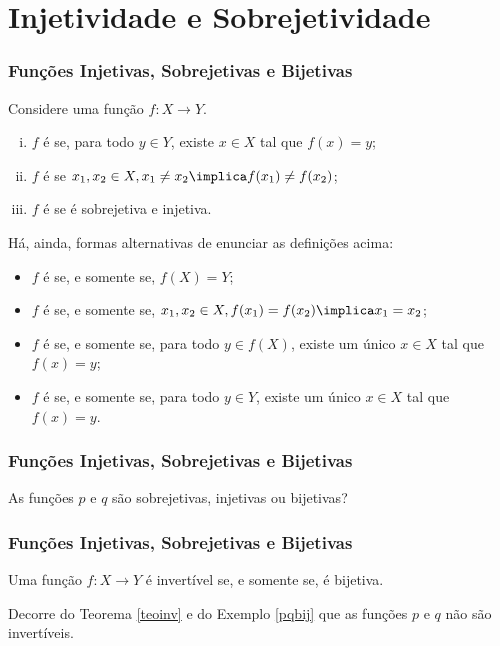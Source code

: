\section{Injetividade e Sobrejetividade}
\begin{frame}
\frametitle{Funções Injetivas, Sobrejetivas e Bijetivas} 


\begin{definicao}
Considere uma função $f: X \to Y$.
\begin{enumerate}[(i)]
	\item $f$ é  se, para todo $y \in Y$, existe $x
	\in X$ tal que $f(x) = y$;
	\item $f$ é  se $x_1, x_2 \in X, x_1 \neq x_2
	\implica f(x_1) \neq f(x_2)$;
	\item $f$ é  se é sobrejetiva e injetiva.
\end{enumerate}
\end{definicao}\pause
Há, ainda, formas alternativas de enunciar as definições acima:
\begin{itemize}
	\item $f$ é  se, e somente se, $f(X) = Y$;
	\item $f$ é  se, e somente se, $x_1, x_2 \in X, f(x_1) = f(x_2)
	\implica x_1 = x_2 $;
	\item $f$ é  se, e somente se, para todo $y \in
	f(X)$, existe um único $x \in X$ tal que $f(x) = y$;
	\item $f$ é  se, e somente se, para todo $y \in Y$,
	existe um único $x \in X$ tal que $f(x) = y$.
\end{itemize}
\end{frame}




\begin{frame}
\frametitle{Funções Injetivas, Sobrejetivas e Bijetivas} 

\begin{exemplo}\label{pqbij}
As funções $p$ e $q$ são sobrejetivas, injetivas ou bijetivas?
\end{exemplo}
\end{frame}




\begin{frame}
\frametitle{Funções Injetivas, Sobrejetivas e Bijetivas} 

\begin{teorema}\label{teoinv}
Uma função $f: X \to Y$ é invertível se, e somente se, é bijetiva.
\end{teorema}\pause

\begin{exemplo}
Decorre do Teorema \ref{teoinv} e do Exemplo \ref{pqbij} que as
funções $p$ e $q$ não são invertíveis.
\end{exemplo}

\end{frame}

